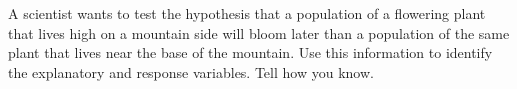 \showpoints

\question[5]
A scientist wants to test the hypothesis that a population of a flowering plant that lives high on a mountain side will bloom later than a population of the same plant that lives near the base of the mountain. Use this information to identify the explanatory and response variables. Tell how you know.

